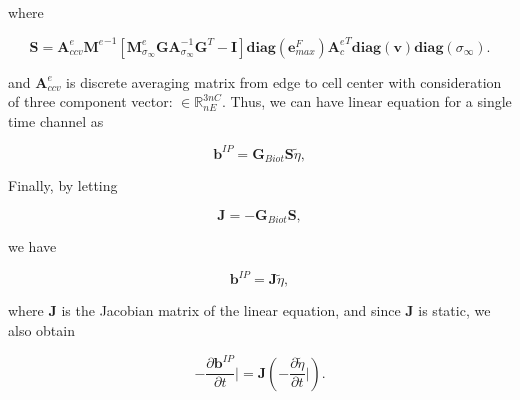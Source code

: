 \documentclass[extra,mreferee]{gji}
\newcommand{\siginf}{\sigma_\infty}
\newcommand{\Ace}{{\mathbf A_c^e}}
\newcommand{\diag}{\mathbf{diag}}
\newcommand{\M}{{\mathbf M}}
\newcommand{\MeSigInf}{{\M^e_{\sigma_\infty}}}
\newcommand{\Me}{{\M^e}}
\newcommand {\db}  { {\mathbf{b} } }
\newcommand {\de}  { {\mathbf{e} } }
\newcommand{\vol}{\mathbf{v}}
\newcommand{\A}{\mathbf{A}}
\newcommand{\Gbiot}{\mathbf{G}_{Biot}}
\newcommand{\peta}{\tilde{\eta}}
\begin{document}
where
\begin{linenomath*}
\begin{equation}
  \mathbf{S} = \mathbf{A}^{e}_{ccv}\Me^{-1}[\MeSigInf \mathbf{G} \A_{\siginf}^{-1}\mathbf{G}^T  - \mathbf{I}] \diag(\de^{F}_{max})\Ace^T\diag(\vol)\diag(\siginf).
\end{equation}
\end{linenomath*}
and $\mathbf{A}^{e}_{ccv}$ is discrete averaging matrix from edge to cell center with consideration of three component vector: $\in \mathbb{R}^{3nC}_{nE}$. 
Thus, we can have linear equation for a single time channel as
\begin{linenomath*}
\begin{equation*}
  \db^{IP} = \Gbiot \mathbf{S} \peta,
\end{equation*}
\end{linenomath*}
Finally, by letting
\begin{linenomath*}
\begin{equation}
  \mathbf{J} = -\Gbiot\mathbf{S},
  \label{eq: Sense}
\end{equation}
\end{linenomath*}
we have
\begin{linenomath*}
\begin{equation}
  \db^{IP} = \mathbf{J}\peta,
  \label{eq: bIP_linear}
\end{equation}
\end{linenomath*}
where $\mathbf{J}$ is the Jacobian matrix of the linear equation, and since $\mathbf{J}$ is static, we also obtain
\begin{linenomath*}
\begin{equation}
  -\frac{\partial\db^{IP}}{\partial t}\Big| = \mathbf{J}(-\frac{\partial \peta}{\partial t}\Big|).
  \label{eq: dbIPdt_linear}
\end{equation}
\end{linenomath*}



\end{document}
